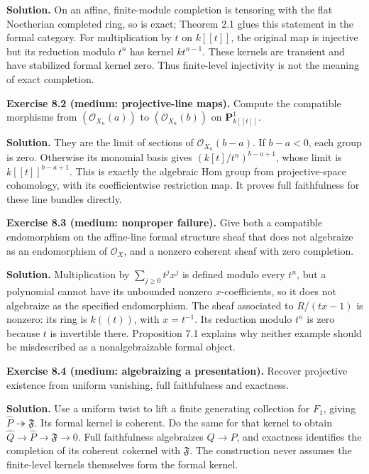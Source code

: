 \documentclass[11pt]{article}
\begin{document}
\textbf{Solution.} On an affine, finite-module completion is tensoring
with the flat Noetherian completed ring, so is exact; Theorem 2.1 glues
this statement in the formal category. For multiplication by \(t\) on
\(k[[t]]\), the original map is injective but its reduction modulo
\(t^n\) has kernel \(k t^{n-1}\). These kernels are transient and have
stabilized formal kernel zero. Thus finite-level injectivity is not the
meaning of exact completion.

\textbf{Exercise 8.2 (medium: projective-line maps).} Compute the
compatible morphisms from \((\mathcal O_{X_n}(a))\) to
\((\mathcal O_{X_n}(b))\) on \(\mathbf P^1_{k[[t]]}\).

\textbf{Solution.} They are the limit of sections of
\(\mathcal O_{X_n}(b-a)\). If \(b-a<0\), each group is zero. Otherwise
its monomial basis gives \((k[t]/t^n)^{b-a+1}\), whose limit is
\(k[[t]]^{b-a+1}\). This is exactly the algebraic Hom group from
projective-space cohomology, with its coefficientwise restriction map.
It proves full faithfulness for these line bundles directly.

\textbf{Exercise 8.3 (medium: nonproper failure).} Give both a
compatible endomorphism on the affine-line formal structure sheaf that
does not algebraize as an endomorphism of \(\mathcal O_X\), and a
nonzero coherent sheaf with zero completion.

\textbf{Solution.} Multiplication by \(\sum_{j\geq0}t^jx^j\) is defined
modulo every \(t^n\), but a polynomial cannot have its unbounded nonzero
\(x\)-coefficients, so it does not algebraize as the specified
endomorphism. The sheaf associated to \(R/(tx-1)\) is nonzero: its ring
is \(k((t))\), with \(x=t^{-1}\). Its reduction modulo \(t^n\) is zero
because \(t\) is invertible there. Proposition 7.1 explains why neither
example should be misdescribed as a nonalgebraizable formal object.

\textbf{Exercise 8.4 (medium: algebraizing a presentation).} Recover
projective existence from uniform vanishing, full faithfulness and
exactness.

\textbf{Solution.} Use a uniform twist to lift a finite generating
collection for \(F_1\), giving
\(\widehat P\twoheadrightarrow\mathfrak F\). Its formal kernel is
coherent. Do the same for that kernel to obtain
\(\widehat Q\to\widehat P\to\mathfrak F\to0\). Full faithfulness
algebraizes \(Q\to P\), and exactness identifies the completion of its
coherent cokernel with \(\mathfrak F\). The construction never assumes
the finite-level kernels themselves form the formal kernel.
\end{document}
